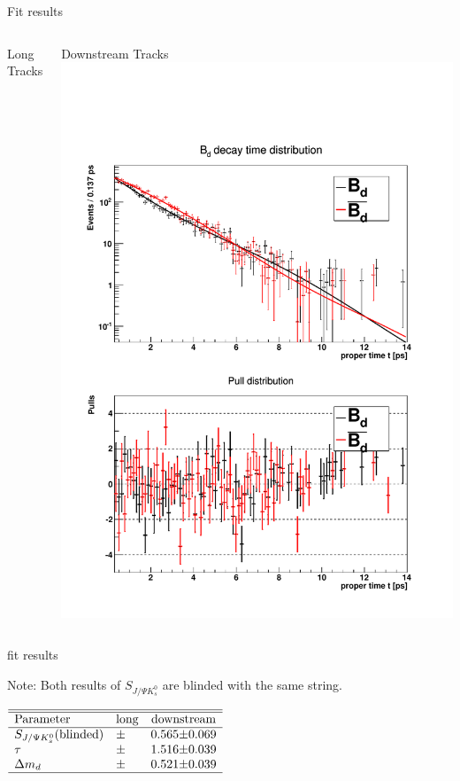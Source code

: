 \documentclass{beamer}
\newcommand{\SJPsi}{S_{J/\Psi K_s^0}}
\begin{document}
	
	\begin{frame}{Fit results}
	\begin{columns}
	\begin{block}{Long Tracks}
	\end{block}
	\begin{block}{Downstream Tracks}
	\includegraphics[width=\textwidth]{decay_distribution_ds}
	\end{block}
	\end{columns}

	\end{frame}
	
	\begin{frame}{fit results}
	\begin{alert}{Note:}
	Both results of $\SJPsi$ are blinded with the same string.
	\end{alert}
	\begin{center}
	$\begin{array}{l r@{\pm}l r@{\pm}l}
	\hline \hline
	\text{Parameter} & \multicolumn{2}{c}{\text{long}} & \multicolumn{2}{c}{\text{downstream}}\\ \hline
	\SJPsi (\text{blinded})    & & & 0.565 & 0.069 \\
	\tau       & & & 1.516 & 0.039 \\
	\Delta m_d & & & 0.521 & 0.039 \\
	\hline
	\end{array}$
	\end{center}
	\end{frame}
\end{document}
